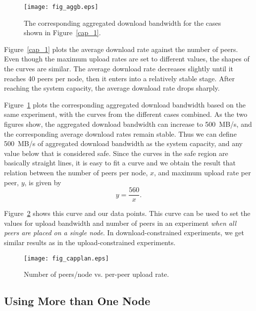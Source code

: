 \documentclass[10pt,letterpaper,twocolumn]{article}
\begin{document}
\begin{figure}[!tb]
\begin{center}
\texttt{[image: fig\_aggb.eps]}
\caption{The corresponding aggregated download bandwidth for the cases
  shown in Figure~\ref{cap_1}.}
\label{cap_2}
\end{center}
\end{figure}

Figure~\ref{cap_1} plots the average download rate against the number
of peers. Even though the maximum upload rates are set to different
values, the shapes of the curves are similar. The average download
rate decreases slightly until it reaches 40 peers per node, then it
enters into a relatively stable stage. After reaching the system
capacity, the average download rate drops sharply.

Figure~\ref{cap_2} plots the corresponding aggregated download
bandwidth based on the same experiment, with the curves from the
different cases combined. As the two figures show, the aggregated
download bandwidth can increase to 500~MB/s, and the corresponding
average download rates remain stable. Thus we can define 500~MB/s of
aggregated download bandwidth as the system capacity, and any value
below that is considered safe. Since the curves in the safe region are
basically straight lines, it is easy to fit a curve and we obtain the
result that relation between the number of peers per node, $x$, and maximum
upload rate per peer, $y$, is given by
\begin{equation}
  \label{eq:1}
  y = \frac{560}{x}.
\end{equation}

Figure~\ref{cap_3} shows this curve and our data points. This curve
can be used to set the values for upload bandwidth and number of peers
in an experiment \textit{when all peers are placed on a single
  node}. In download-constrained experiments, we get similar results
as in the upload-constrained experiments.

\begin{figure}[!tb]
\begin{center}
\texttt{[image: fig\_capplan.eps]}
\caption{Number of peers/node vs. per-peer upload rate.}
\label{cap_3}
\end{center}
\end{figure}


\subsection{Using More than One Node}
\label{sec:using-more-than}
\end{document}
